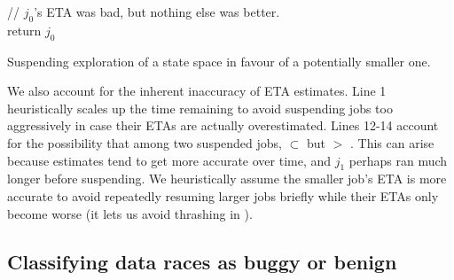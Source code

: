\begin{algorithm}[t]
	// $j_0$'s ETA was bad, but nothing else was better. \\
	return $j_0$
	\caption{Suspending exploration of a state space in favour of a potentially smaller one.}
	\label{alg:shouldworkblock}
\end{algorithm}

%
We also account for the inherent inaccuracy of ETA estimates.
Line 1 heuristically scales up the time remaining to avoid suspending jobs too aggressively
in case their ETAs are actually overestimated.
Lines 12-14 account for the
possibility that among two suspended jobs,
 $\subset$ 
but
 $>$ .
This can arise because estimates tend to get more accurate over time,
and $j_1$ perhaps ran much longer before suspending.
We heuristically assume the smaller job's ETA is more accurate
to avoid repeatedly resuming larger jobs briefly while their ETAs only become worse
(it lets us avoid thrashing in \quicksand).

\subsection{Classifying data races as buggy or benign}


